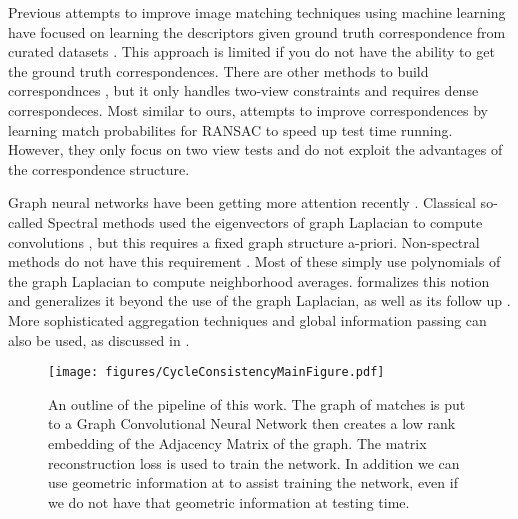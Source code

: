 \documentclass[10pt,twocolumn,letterpaper]{article}
\begin{document}
Previous attempts to improve image matching techniques using machine learning have focused on learning the descriptors given ground truth correspondence from curated datasets \cite{zagoruyko2015learning, yi2016lift, brachmann2017dsac}. This approach is limited if you do not have the ability to get the ground truth correspondences.
There are other methods to build correspondnces \cite{choy2016universal}, but it only handles two-view constraints and requires dense correspondeces.
Most similar to ours, \cite{yi2018learning} attempts to improve correspondences by learning match probabilites for RANSAC to speed up test time running. However, they only focus on two view tests and do not exploit the advantages of the correspondence structure.

Graph neural networks have been getting more attention recently 
\cite{bronstein2017geometric, bruna2013spectral, defferrard2016convolutional, kipf2016semi, scarselli2009graph, gama2018mimo, gama2018convolutional, battaglia2018relational}.
Classical so-called Spectral methods used the eigenvectors of graph Laplacian to compute convolutions \cite{bronstein2017geometric}, but this requires a fixed graph structure a-priori.  
Non-spectral methods do not have this requirement \cite{bronstein2017geometric, kipf2016semi, scarselli2009graph, gama2018convolutional}. Most of these simply use polynomials of the graph Laplacian to compute neighborhood averages. \cite{gama2018mimo} formalizes this notion and generalizes it beyond the use of the graph Laplacian, as well as its follow up \cite{gama2018convolutional}. More sophisticated aggregation techniques and global information passing can also be used, as discussed in \cite{battaglia2018relational}.

\begin{figure*}[t]
\begin{center}
  \texttt{[image: figures/CycleConsistencyMainFigure.pdf]}
\end{center}
  \caption{
    An outline of the pipeline of this work.
    The graph of matches is put to a Graph Convolutional Neural Network \cite{kipf2016semi} then creates a low rank embedding of the Adjacency Matrix of the graph.
    The matrix reconstruction loss is used to train the network.
    In addition we can use geometric information at to assist training the network, even if we do not have that geometric information at testing time.
  }
\label{fig:pipeline}
\label{fig:onecol}
\end{figure*}
\end{document}
